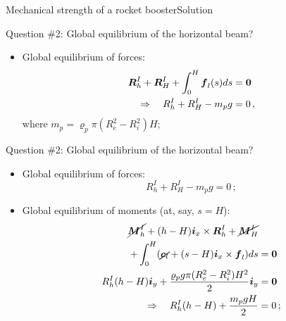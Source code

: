 \documentclass{beamer}
\newcommand{\id}{d}
\newcommand{\imply}{\Rightarrow}
\newcommand{\cj}{c}
\newcommand{\cv}{{\boldsymbol\cj}}
\newcommand{\xj}{x}
\newcommand{\yj}{y}
\renewcommand{\ij}{i}
\newcommand{\iv}{{\boldsymbol\ij}}
\newcommand{\fj}{f}
\newcommand{\Rj}{R}
\newcommand{\fv}{{\boldsymbol\fj}}
\newcommand{\Rv}{{\boldsymbol\Rj}}
\newcommand{\roi}{\varrho}
\newcommand{\Mresj}{M}
\newcommand{\Mres}{{\boldsymbol\Mresj}}
\newcommand{\bzero}{{\bf 0}}
\begin{document}
\begin{frame}{Mechanical strength of a rocket booster}{Solution}

\begin{overprint}

\vskip-20pt
\begin{exampleblock}{Question \#2: Global equilibrium of the horizontal beam?}
\begin{itemize}
\item Global equilibrium of forces:
\begin{displaymath}
\begin{split}
\Rv_h^I+\Rv_H^I+\int_0^H\fv_l(s)\id s &=\bzero \\
\imply\quad \Rj_h^I+\Rj_H^I-m_p g &=0\,,
\end{split}
\end{displaymath}
where $m_p=\roi_p\pi(R_e^2-R_i^2)H$;
\end{itemize}
\end{exampleblock}

\vskip-20pt
\begin{exampleblock}{Question \#2: Global equilibrium of the horizontal beam?}
\begin{itemize}
\item Global equilibrium of forces:
\begin{displaymath}
\Rj_h^I+\Rj_H^I-m_p g=0\,;
\end{displaymath}
\item Global equilibrium of moments (at, say, $s=H$):
\begin{displaymath}
\begin{split}
\cancel{\Mres_h^I}+(h-H)\iv_\xj\times\Rv_h^I+\cancel{\Mres_H^I} & \\
+\int_0^H(\cancel{\cv_l}+(s-H)\iv_\xj\times\fv_l) \id s &=\bzero \\
\Rj_h^I(h-H)\iv_\yj +\frac{\roi_p g \pi(R_e^2-R_i^2)H^2}{2}\iv_\yj &=\bzero \\
\imply\quad \Rj_h^I(h-H)+\frac{m_p gH}{2} &=0\,;
\end{split}
\end{displaymath}
\end{itemize}
\end{exampleblock}


\end{overprint}
\end{frame}
\end{document}
